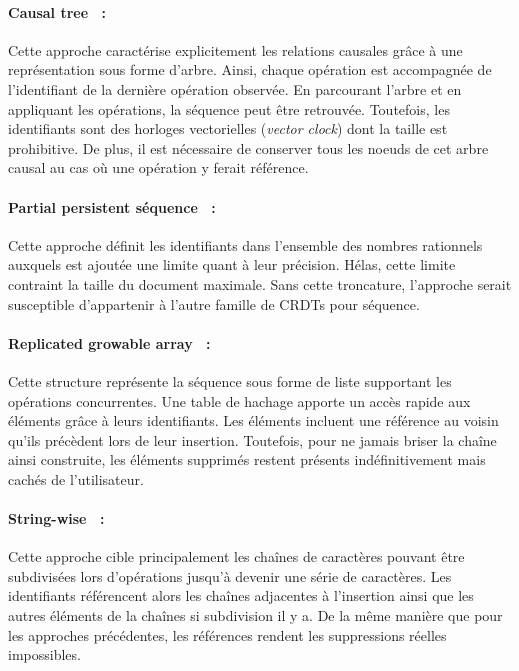 \paragraph{Causal tree~\cite{grishchenko2010deep} :} Cette approche caractérise
explicitement les relations causales grâce à une représentation sous forme
d'arbre. Ainsi, chaque opération est accompagnée de l'identifiant de la dernière
opération observée. En parcourant l'arbre et en appliquant les opérations, la
séquence peut être retrouvée. Toutefois, les identifiants sont des horloges
vectorielles (\emph{vector clock}) dont la taille est prohibitive. De plus, il
est nécessaire de conserver tous les noeuds de cet arbre causal au cas où une
opération y ferait référence.

\paragraph{Partial persistent séquence~\cite{wu2010partial} :} Cette approche
définit les identifiants dans l'ensemble des nombres rationnels auxquels est
ajoutée une limite quant à leur précision. Hélas, cette limite contraint la
taille du document maximale. Sans cette troncature, l'approche serait
susceptible d'appartenir à l'autre famille de CRDTs pour séquence.

\paragraph{Replicated growable array~\cite{roh2011replicated} :} Cette structure
représente la séquence sous forme de liste supportant les opérations
concurrentes. Une table de hachage apporte un accès rapide aux éléments grâce à
leurs identifiants. Les éléments incluent une référence au voisin qu'ils
précèdent lors de leur insertion. Toutefois, pour ne jamais briser la chaîne
ainsi construite, les éléments supprimés restent présents indéfinitivement mais
cachés de l'utilisateur.

\paragraph{String-wise~\cite{yu2012stringwise} :} Cette approche cible
principalement les chaînes de caractères pouvant être subdivisées lors
d'opérations jusqu'à devenir une série de caractères. Les identifiants
référencent alors les chaînes adjacentes à l'insertion ainsi que les autres
éléments de la chaînes si subdivision il y a. De la même manière que pour les
approches précédentes, les références rendent les suppressions réelles
impossibles.

